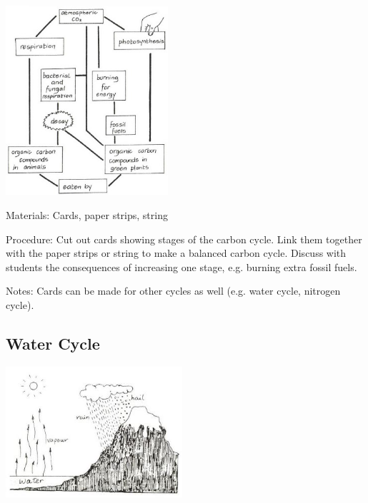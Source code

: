 \begin{multicols}{2}
\begin{center}
\includegraphics[width=0.45\textwidth]{./img/vso/carbon-cycle.jpg}
\end{center}

\begin{description*}
\item[Materials:]{Cards, paper strips, string}
\item[Procedure:]{Cut out cards showing stages of
the carbon cycle. Link them
together with the paper strips or string to
make a balanced carbon cycle.
Discuss with students the
consequences of increasing one
stage, e.g. burning extra fossil
fuels.}
\item[Notes:]{Cards can be made for other cycles as well (e.g. water cycle, nitrogen cycle).}
\end{description*}

\columnbreak

\subsection{Water Cycle}  

\begin{center}
\includegraphics[width=0.49\textwidth]{./img/source/water-cycle.jpg}
\end{center}


\end{multicols}
